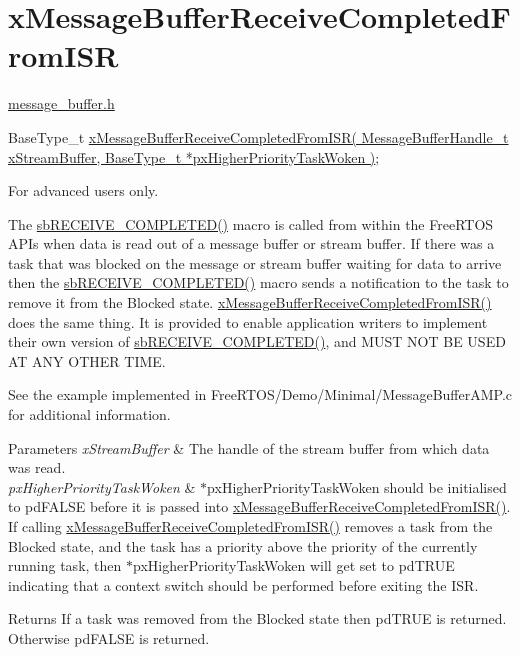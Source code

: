 \hypertarget{group__x_message_buffer_receive_completed_from_i_s_r}{}\section{x\+Message\+Buffer\+Receive\+Completed\+From\+I\+SR}
\label{group__x_message_buffer_receive_completed_from_i_s_r}
\hyperlink{message__buffer_8h}{message\+\_\+buffer.\+h}


\begin{DoxyPre}
BaseType\_t \hyperlink{message__buffer_8h_a22b1a37d0d4f39acd87250f73d9aab0c}{xMessageBufferReceiveCompletedFromISR( MessageBufferHandle\_t xStreamBuffer, BaseType\_t *pxHigherPriorityTaskWoken )};
\end{DoxyPre}


For advanced users only.

The \hyperlink{stream__buffer_8c_a4d6a29d283acfa2d4ef576476eedc789}{sb\+R\+E\+C\+E\+I\+V\+E\+\_\+\+C\+O\+M\+P\+L\+E\+T\+E\+D()} macro is called from within the Free\+R\+T\+OS A\+P\+Is when data is read out of a message buffer or stream buffer. If there was a task that was blocked on the message or stream buffer waiting for data to arrive then the \hyperlink{stream__buffer_8c_a4d6a29d283acfa2d4ef576476eedc789}{sb\+R\+E\+C\+E\+I\+V\+E\+\_\+\+C\+O\+M\+P\+L\+E\+T\+E\+D()} macro sends a notification to the task to remove it from the Blocked state. \hyperlink{message__buffer_8h_a22b1a37d0d4f39acd87250f73d9aab0c}{x\+Message\+Buffer\+Receive\+Completed\+From\+I\+S\+R()} does the same thing. It is provided to enable application writers to implement their own version of \hyperlink{stream__buffer_8c_a4d6a29d283acfa2d4ef576476eedc789}{sb\+R\+E\+C\+E\+I\+V\+E\+\_\+\+C\+O\+M\+P\+L\+E\+T\+E\+D()}, and M\+U\+ST N\+OT BE U\+S\+ED AT A\+NY O\+T\+H\+ER T\+I\+ME.

See the example implemented in Free\+R\+T\+O\+S/\+Demo/\+Minimal/\+Message\+Buffer\+A\+M\+P.\+c for additional information.


\begin{DoxyParams}{Parameters}
{\em x\+Stream\+Buffer} & The handle of the stream buffer from which data was read.\\
\hline
{\em px\+Higher\+Priority\+Task\+Woken} & $\ast$px\+Higher\+Priority\+Task\+Woken should be initialised to pd\+F\+A\+L\+SE before it is passed into \hyperlink{message__buffer_8h_a22b1a37d0d4f39acd87250f73d9aab0c}{x\+Message\+Buffer\+Receive\+Completed\+From\+I\+S\+R()}. If calling \hyperlink{message__buffer_8h_a22b1a37d0d4f39acd87250f73d9aab0c}{x\+Message\+Buffer\+Receive\+Completed\+From\+I\+S\+R()} removes a task from the Blocked state, and the task has a priority above the priority of the currently running task, then $\ast$px\+Higher\+Priority\+Task\+Woken will get set to pd\+T\+R\+UE indicating that a context switch should be performed before exiting the I\+SR.\\
\hline
\end{DoxyParams}
\begin{DoxyReturn}{Returns}
If a task was removed from the Blocked state then pd\+T\+R\+UE is returned. Otherwise pd\+F\+A\+L\+SE is returned. 
\end{DoxyReturn}
